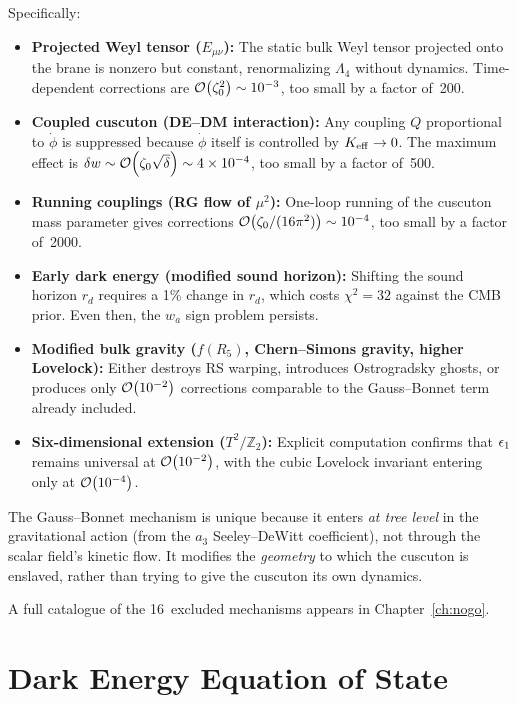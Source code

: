Specifically:
\begin{itemize}
\item \textbf{Projected Weyl tensor ($E_{\mu\nu}$):} The static bulk Weyl tensor projected onto the brane is nonzero but constant, renormalizing $\Lambda_4$ without dynamics. Time-dependent corrections are $\mathcal{O}\!\left(\zeta_0^2\right) \sim 10^{-3}$, too small by a factor of~200.

\item \textbf{Coupled cuscuton (DE--DM interaction):} Any coupling $Q$ proportional to $\dot\phi$ is suppressed because $\dot\phi$ itself is controlled by $K_{\mathrm{eff}} \to 0$. The maximum effect is $\delta w \sim \mathcal{O}\!\left(\zeta_0\sqrt{\delta}\right) \sim 4 \times 10^{-4}$, too small by a factor of~500.

\item \textbf{Running couplings (RG flow of $\mu^2$):} One-loop running of the cuscuton mass parameter gives corrections $\mathcal{O}\!\left(\zeta_0/(16\pi^2)\right) \sim 10^{-4}$, too small by a factor of~2000.

\item \textbf{Early dark energy (modified sound horizon):} Shifting the sound horizon $r_d$ requires a 1\% change in $r_d$, which costs $\chi^2 = 32$ against the CMB prior. Even then, the $w_a$ sign problem persists.

\item \textbf{Modified bulk gravity ($f(R_5)$, Chern--Simons gravity, higher Lovelock):} Either destroys RS warping, introduces Ostrogradsky ghosts, or produces only $\mathcal{O}\!\left(10^{-2}\right)$ corrections comparable to the Gauss--Bonnet term already included.

\item \textbf{Six-dimensional extension ($T^2/\mathbb{Z}_2$):} Explicit computation confirms that $\epsilon_1$ remains universal at $\mathcal{O}\!\left(10^{-2}\right)$, with the cubic Lovelock invariant entering only at $\mathcal{O}\!\left(10^{-4}\right)$.
\end{itemize}

The Gauss--Bonnet mechanism is unique because it enters \emph{at tree level} in the gravitational action (from the $a_3$ Seeley--DeWitt coefficient), not through the scalar field's kinetic flow. It modifies the \emph{geometry} to which the cuscuton is enslaved, rather than trying to give the cuscuton its own dynamics.

A full catalogue of the 16~excluded mechanisms appears in Chapter~\ref{ch:nogo}.


\section{Dark Energy Equation of State}
\label{sec:1-eos}

